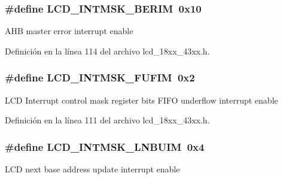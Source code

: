 \subsubsection[{\texorpdfstring{L\+C\+D\+\_\+\+I\+N\+T\+M\+S\+K\+\_\+\+B\+E\+R\+IM}{LCD_INTMSK_BERIM}}]{\setlength{\rightskip}{0pt plus 5cm}\#define L\+C\+D\+\_\+\+I\+N\+T\+M\+S\+K\+\_\+\+B\+E\+R\+IM~0x10}\hypertarget{group___l_c_d__18_x_x__43_x_x_ga806f8a96720000a09b6de988d3d46291}{}\label{group___l_c_d__18_x_x__43_x_x_ga806f8a96720000a09b6de988d3d46291}
A\+HB master error interrupt enable 

Definición en la línea 114 del archivo lcd\+\_\+18xx\+\_\+43xx.\+h.

\subsubsection[{\texorpdfstring{L\+C\+D\+\_\+\+I\+N\+T\+M\+S\+K\+\_\+\+F\+U\+F\+IM}{LCD_INTMSK_FUFIM}}]{\setlength{\rightskip}{0pt plus 5cm}\#define L\+C\+D\+\_\+\+I\+N\+T\+M\+S\+K\+\_\+\+F\+U\+F\+IM~0x2}\hypertarget{group___l_c_d__18_x_x__43_x_x_gae2537e91c439a06b08c27e63c8639fd8}{}\label{group___l_c_d__18_x_x__43_x_x_gae2537e91c439a06b08c27e63c8639fd8}
L\+CD Interrupt control mask register bits F\+I\+FO underflow interrupt enable 

Definición en la línea 111 del archivo lcd\+\_\+18xx\+\_\+43xx.\+h.

\subsubsection[{\texorpdfstring{L\+C\+D\+\_\+\+I\+N\+T\+M\+S\+K\+\_\+\+L\+N\+B\+U\+IM}{LCD_INTMSK_LNBUIM}}]{\setlength{\rightskip}{0pt plus 5cm}\#define L\+C\+D\+\_\+\+I\+N\+T\+M\+S\+K\+\_\+\+L\+N\+B\+U\+IM~0x4}\hypertarget{group___l_c_d__18_x_x__43_x_x_gafc1a133f89801ad8c911d73e213d7349}{}\label{group___l_c_d__18_x_x__43_x_x_gafc1a133f89801ad8c911d73e213d7349}
L\+CD next base address update interrupt enable 

